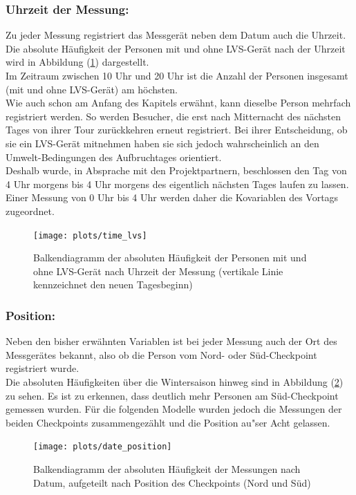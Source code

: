\documentclass[12pt]{scrreprt}
\begin{document}
\newpage
\subsubsection*{Uhrzeit der Messung:}
Zu jeder Messung registriert das Messgerät neben dem Datum auch die Uhrzeit. Die absolute Häufigkeit der Personen mit und ohne LVS-Gerät nach der Uhrzeit wird in Abbildung (\ref{pic:time_lvs}) dargestellt. \\
Im Zeitraum zwischen 10 Uhr und 20 Uhr ist die Anzahl der Personen insgesamt (mit und ohne LVS-Gerät) am höchsten. \\
Wie auch schon am Anfang des Kapitels erwähnt, kann dieselbe Person mehrfach registriert werden. So werden Besucher, die erst nach Mitternacht des nächsten Tages von ihrer Tour zurückkehren erneut registriert. Bei ihrer Entscheidung, ob sie ein LVS-Gerät mitnehmen haben sie sich jedoch wahrscheinlich an den Umwelt-Bedingungen des Aufbruchtages orientiert. \\
Deshalb wurde, in Absprache mit den Projektpartnern, beschlossen den Tag von 4 Uhr morgens bis 4 Uhr morgens des eigentlich nächsten Tages laufen zu lassen. Einer Messung von 0 Uhr bis 4 Uhr werden daher die Kovariablen des Vortags zugeordnet. 
\begin{figure}[H]
	\centering
	\texttt{[image: plots/time\_lvs]}
	\caption{Balkendiagramm der absoluten Häufigkeit der Personen mit und ohne LVS-Gerät nach Uhrzeit der Messung (vertikale Linie kennzeichnet den neuen Tagesbeginn)}
	\label{pic:time_lvs}	
\end{figure}

\newpage
\subsubsection*{Position:}
Neben den bisher erwähnten Variablen ist bei jeder Messung auch der Ort des Messgerätes bekannt, also ob die Person vom Nord- oder Süd-Checkpoint registriert wurde. \\
Die absoluten Häufigkeiten über die Wintersaison hinweg sind in Abbildung (\ref{pic:date_position}) zu sehen. Es ist zu erkennen, dass deutlich mehr Personen am Süd-Checkpoint gemessen wurden. Für die folgenden Modelle wurden jedoch die Messungen der beiden Checkpoints zusammengezählt und die Position au"ser Acht gelassen.
\begin{figure}[H]
	\centering
	\texttt{[image: plots/date\_position]}
	\caption{Balkendiagramm der absoluten Häufigkeit der Messungen nach Datum, aufgeteilt nach Position des Checkpoints (Nord und Süd)}
	\label{pic:date_position}	
\end{figure}
\end{document}
